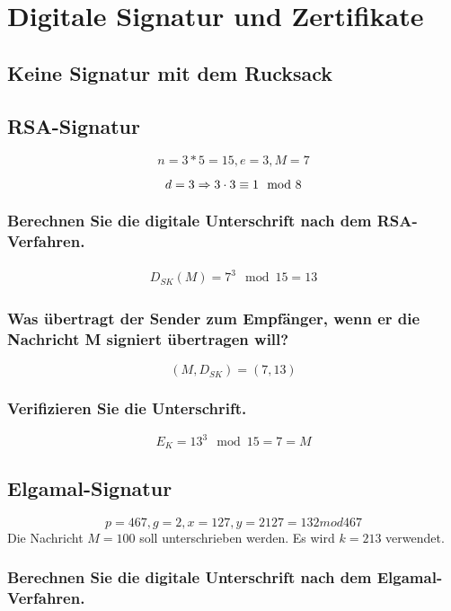 \section{Digitale Signatur und Zertifikate}

\subsection{Keine Signatur mit dem Rucksack}

\subsection{RSA-Signatur}
	\[n = 3 * 5 = 15, e = 3, M = 7\]
	
   \[ d = 3 \Rightarrow 3 \cdot 3 \equiv 1 \mod 8 \]	
	
\subsubsection{Berechnen Sie die digitale Unterschrift nach dem RSA-Verfahren.}

\begin{align}
	D_{SK}(M) = 7^{3} \mod 15 = 13
\end{align}

\subsubsection{Was übertragt der Sender zum Empfänger, wenn er die Nachricht M signiert übertragen will?}
	
	\[ (M,D_{SK}) = (7,13) \]

\subsubsection{Verifizieren Sie die Unterschrift.}

\[ E_{K} = 13^{3} \mod 15 = 7 = M \]


\subsection{Elgamal-Signatur}
\[ p = 467, g = 2, x = 127, y = 2127 = 132 mod 467\]
Die Nachricht $M = 100$ soll unterschrieben werden. Es wird $k = 213$ verwendet.
\subsubsection{Berechnen Sie die digitale Unterschrift nach dem Elgamal-Verfahren.}

